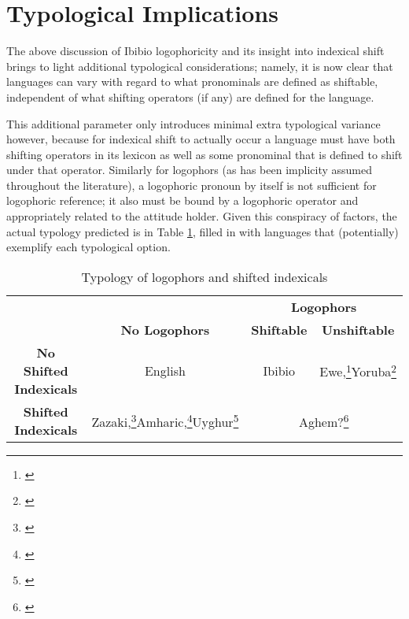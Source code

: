 \documentclass[output=paper]{langscibook}
\begin{document}
\section{Typological Implications}

The above discussion of Ibibio logophoricity and its insight into indexical shift brings to light additional typological considerations; namely, it is now clear that languages can vary with regard to what pronominals are defined as shiftable, independent of what shifting operators (if any) are defined for the language.

This additional parameter only introduces minimal extra typological variance however, because for indexical shift to actually occur a language must have both shifting operators in its lexicon as well as some pronominal that is defined to shift under that operator. Similarly for logophors (as has been implicity assumed throughout the literature), a logophoric pronoun by itself is not sufficient for logophoric reference; it also must be bound by a logophoric operator and appropriately related to the attitude holder. Given this conspiracy of factors, the actual typology predicted is in Table \ref{type}, filled in with languages that (potentially) exemplify each typological option.



\begin{table}
\begin{tabular}{c|c|c|c}
	&	&	\multicolumn{2}{c}{\textbf{Logophors}} \\
	&	\textbf{No Logophors}	&	\textbf{Shiftable}	&	\textbf{Unshiftable} \\ \hline
\textbf{No Shifted Indexicals} &	English	&	Ibibio	&	Ewe,\footnote{\citet{Clements1975,Pearson2015}}Yoruba\footnote{\citet{Adesola2005}}		\\ \hline
	\textbf{Shifted Indexicals}	& Zazaki,\footnote{\citet{Anand2004,Anand2006}}Amharic,\footnote{\citet{Schlenker2003}}Uyghur\footnote{\citet{Sudo2012,Shklovsky2014}}	&	\multicolumn{2}{c}{Aghem?\footnote{\citet{Hyman1979}}}
\end{tabular}
\caption{Typology of logophors and shifted indexicals}\label{type}
\end{table}
\end{document}

